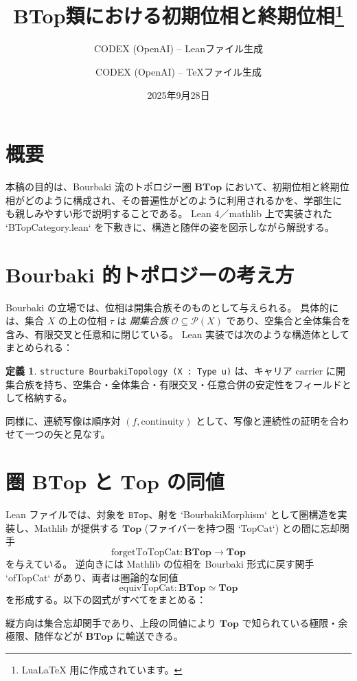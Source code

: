 \documentclass[]{jlreq}
\title{BTop類における初期位相と終期位相\thanks{LuaLaTeX 用に作成されています。}}
\author{CODEX (OpenAI) -- Leanファイル生成 \and CODEX (OpenAI) -- TeXファイル生成}
\date{2025年9月28日}
\theoremstyle{definition}
\newtheorem{definition}{定義}
\theoremstyle{remark}
\begin{document}
\maketitle

\section{概要}
本稿の目的は、Bourbaki 流のトポロジー圏 $\mathbf{BTop}$ において、初期位相と終期位相がどのように構成され、その普遍性がどのように利用されるかを、学部生にも親しみやすい形で説明することである。
Lean 4／mathlib 上で実装された `BTopCategory.lean` を下敷きに、構造と随伴の姿を図示しながら解説する。

\section{Bourbaki 的トポロジーの考え方}
Bourbaki の立場では、位相は開集合族そのものとして与えられる。
具体的には、集合 $X$ の上の位相 $\tau$ は \emph{開集合族} $\mathcal{O}\subseteq\mathcal{P}(X)$ であり、空集合と全体集合を含み、有限交叉と任意和に閉じている。
Lean 実装では次のような構造体としてまとめられる：
\begin{definition}
\texttt{structure BourbakiTopology (X : Type u)} は、キャリア $\mathrm{carrier}$ に開集合族を持ち、空集合・全体集合・有限交叉・任意合併の安定性をフィールドとして格納する。
\end{definition}

同様に、連続写像は順序対 $(f, \text{continuity})$ として、写像と連続性の証明を合わせて一つの矢と見なす。

\section{圏 $\mathbf{BTop}$ と $\mathbf{Top}$ の同値}
Lean ファイルでは、対象を $\texttt{BTop}$、射を `BourbakiMorphism` として圏構造を実装し、Mathlib が提供する $\mathbf{Top}$ (ファイバーを持つ圏 `TopCat`) との間に忘却関手
\[\mathrm{forgetToTopCat} : \mathbf{BTop} \to \mathbf{Top}\]
を与えている。
逆向きには Mathlib の位相を Bourbaki 形式に戻す関手 `ofTopCat` があり、両者は圏論的な同値
\[\mathrm{equivTopCat} : \mathbf{BTop} \simeq \mathbf{Top}
\]
を形成する。以下の図式がすべてをまとめる：
\begin{center}
\end{center}
縦方向は集合忘却関手であり、上段の同値により $\mathbf{Top}$ で知られている極限・余極限、随伴などが $\mathbf{BTop}$ に輸送できる。
\end{document}
